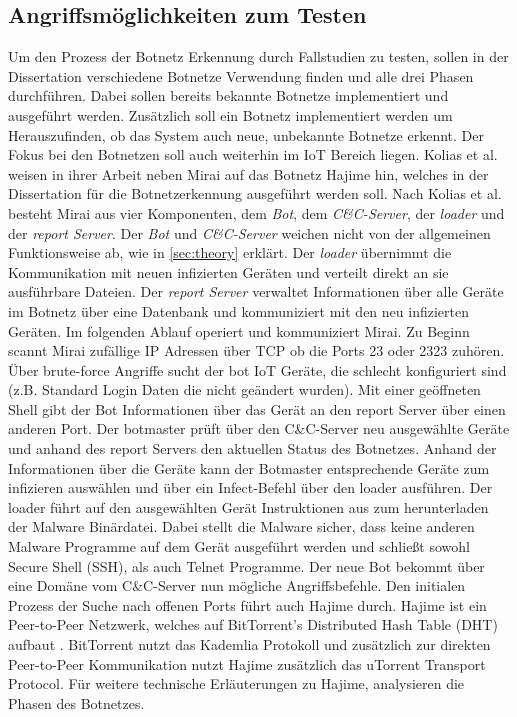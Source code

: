 \subsection*{Angriffsmöglichkeiten zum Testen}
Um den Prozess der Botnetz Erkennung durch Fallstudien zu testen, sollen in der Dissertation verschiedene Botnetze Verwendung finden und alle drei Phasen durchführen. Dabei sollen bereits bekannte
Botnetze implementiert und ausgeführt werden. Zusätzlich soll ein Botnetz implementiert werden um Herauszufinden, ob das System auch neue, unbekannte Botnetze erkennt. Der Fokus bei den Botnetzen 
soll auch weiterhin im IoT Bereich liegen. Kolias et al. \cite{DBLP:journals/computer/KoliasKSV17} weisen in ihrer Arbeit neben Mirai auf das Botnetz Hajime hin, welches in der Dissertation
für die Botnetzerkennung ausgeführt werden soll. Nach Kolias et al. besteht Mirai aus vier Komponenten, dem \textit{Bot}, dem \textit{C\&C-Server}, der \textit{loader} und der \textit{report Server}. 
Der \textit{Bot} und \textit{C\&C-Server} weichen nicht von der allgemeinen Funktionsweise ab, wie in \ref{sec:theory} erklärt. Der \textit{loader} übernimmt die Kommunikation mit neuen infizierten 
Geräten und verteilt direkt an sie ausführbare Dateien. Der \textit{report Server} verwaltet Informationen über alle Geräte im Botnetz über eine Datenbank und kommuniziert mit den neu infizierten Geräten. 
Im folgenden Ablauf operiert und kommuniziert Mirai. 
Zu Beginn scannt Mirai zufällige IP Adressen über TCP ob die Ports 23 oder 2323 zuhören. Über brute-force Angriffe sucht der bot IoT Geräte, die schlecht konfiguriert sind (z.B. Standard Login Daten die
nicht geändert wurden). Mit einer geöffneten Shell gibt der Bot Informationen über das Gerät an den report Server über einen anderen Port. Der botmaster prüft über den C\&C-Server neu ausgewählte Geräte 
und anhand des report Servers den aktuellen Status des Botnetzes. Anhand der Informationen über die Geräte kann der Botmaster entsprechende Geräte zum infizieren auswählen und über ein Infect-Befehl 
über den loader ausführen. Der loader führt auf den ausgewählten Gerät Instruktionen aus zum herunterladen der Malware Binärdatei. Dabei stellt die Malware sicher, dass keine anderen Malware Programme auf
dem Gerät ausgeführt werden und schließt sowohl Secure Shell (SSH), als auch Telnet Programme. Der neue Bot bekommt über eine Domäne vom C\&C-Server nun mögliche Angriffsbefehle. Den initialen Prozess 
der Suche nach offenen Ports führt auch Hajime durch. Hajime ist ein Peer-to-Peer Netzwerk, welches auf BitTorrent's Distributed Hash Table (DHT) aufbaut \cite{DBLP:conf/ndss/HerwigHHRL19,2017AnalyzingTP}. 
BitTorrent nutzt das Kademlia Protokoll \cite{DBLP:conf/iptps/MaymounkovM02} und zusätzlich zur direkten Peer-to-Peer Kommunikation nutzt Hajime zusätzlich das uTorrent Transport Protocol. Für weitere
technische Erläuterungen zu Hajime, analysieren \cite{DBLP:conf/ndss/HerwigHHRL19} die Phasen des Botnetzes. 

